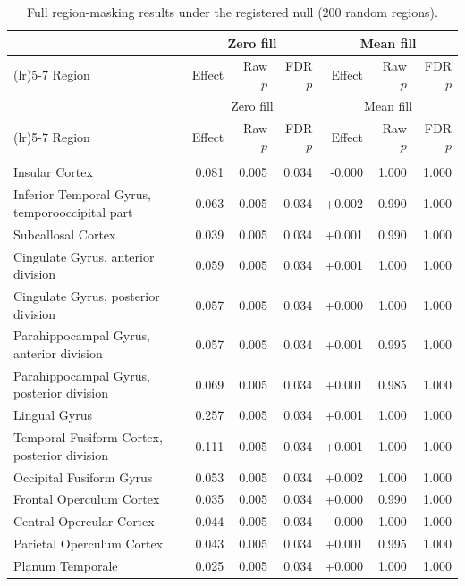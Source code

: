 \documentclass[11pt]{article}
\begin{document}
{\small
\begin{longtable}{>{\raggedright\arraybackslash}p{6.4cm}rrrrrr}
\caption{Full region-masking results under the registered null (200 random regions).}\label{tab:fullreg}\\
\toprule
& \multicolumn{3}{c}{Zero fill} & \multicolumn{3}{c}{Mean fill} \\
\cmidrule(lr){2-4}\cmidrule(lr){5-7}
Region & Effect & Raw $p$ & FDR $p$ & Effect & Raw $p$ & FDR $p$ \\
\midrule
\endfirsthead
\toprule
& \multicolumn{3}{c}{Zero fill} & \multicolumn{3}{c}{Mean fill} \\
\cmidrule(lr){2-4}\cmidrule(lr){5-7}
Region & Effect & Raw $p$ & FDR $p$ & Effect & Raw $p$ & FDR $p$ \\
\midrule
\endhead
\midrule
\multicolumn{7}{r}{\emph{continued on next page}}\\
\endfoot
\bottomrule
\endlastfoot
Insular Cortex & 0.081 & 0.005 & 0.034 & -0.000 & 1.000 & 1.000 \\
Inferior Temporal Gyrus, temporooccipital part & 0.063 & 0.005 & 0.034 & +0.002 & 0.990 & 1.000 \\
Subcallosal Cortex & 0.039 & 0.005 & 0.034 & +0.001 & 0.990 & 1.000 \\
Cingulate Gyrus, anterior division & 0.059 & 0.005 & 0.034 & +0.001 & 1.000 & 1.000 \\
Cingulate Gyrus, posterior division & 0.057 & 0.005 & 0.034 & +0.000 & 1.000 & 1.000 \\
Parahippocampal Gyrus, anterior division & 0.057 & 0.005 & 0.034 & +0.001 & 0.995 & 1.000 \\
Parahippocampal Gyrus, posterior division & 0.069 & 0.005 & 0.034 & +0.001 & 0.985 & 1.000 \\
Lingual Gyrus & 0.257 & 0.005 & 0.034 & +0.001 & 1.000 & 1.000 \\
Temporal Fusiform Cortex, posterior division & 0.111 & 0.005 & 0.034 & +0.001 & 1.000 & 1.000 \\
Occipital Fusiform Gyrus & 0.053 & 0.005 & 0.034 & +0.002 & 1.000 & 1.000 \\
Frontal Operculum Cortex & 0.035 & 0.005 & 0.034 & +0.000 & 0.990 & 1.000 \\
Central Opercular Cortex & 0.044 & 0.005 & 0.034 & -0.000 & 1.000 & 1.000 \\
Parietal Operculum Cortex & 0.043 & 0.005 & 0.034 & +0.001 & 0.995 & 1.000 \\
Planum Temporale & 0.025 & 0.005 & 0.034 & +0.000 & 1.000 & 1.000 \\

\end{longtable}}
\end{document}
